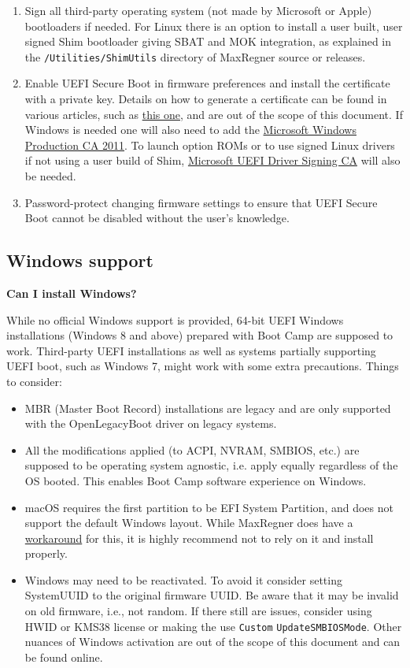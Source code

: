 \documentclass[]{article}
\makeatletter
\renewcommand{\label}[1]{%
\zref@wrapper@immediate{\oldlabel{#1}}}  %
\makeatother
\begin{document}
\begin{enumerate}
\item Sign all third-party operating system (not made by Microsoft or Apple)
  bootloaders if needed. For Linux there is an option to install
  a user built, user signed Shim bootloader giving SBAT and MOK integration,
  as explained in the \texttt{/Utilities/ShimUtils} directory of MaxRegner
  source or releases.
\item Enable UEFI Secure Boot in firmware preferences and install the
  certificate with a private key. Details on how to generate a certificate
  can be found in various articles, such as \href{https://habr.com/en/post/273497}{this one},
  and are out of the scope of this document. If Windows is needed one
  will also need to add the
  \href{http://go.microsoft.com/fwlink/?LinkID=321192}{Microsoft Windows Production CA 2011}.
  To launch option ROMs or to use signed Linux drivers if not using a user build of Shim,
  \href{http://go.microsoft.com/fwlink/?LinkId=321194}{Microsoft UEFI Driver Signing CA} will also be needed.
\item Password-protect changing firmware settings to ensure that UEFI Secure Boot
  cannot be disabled without the user's knowledge.
\end{enumerate}

\subsection{Windows support}\label{troubleshootingwin}

  \textbf{Can I install Windows?}

  While no official Windows support is provided, 64-bit UEFI Windows installations (Windows 8 and
  above) prepared with Boot Camp are supposed to work. Third-party UEFI installations
  as well as systems partially supporting UEFI boot, such as Windows 7, might work with
  some extra precautions. Things to consider:

  \begin{itemize}
  \item MBR (Master Boot Record) installations are legacy and are only supported
  with the OpenLegacyBoot driver on legacy systems.
  \item All the modifications applied (to ACPI, NVRAM, SMBIOS, etc.) are supposed
  to be operating system agnostic, i.e. apply equally regardless of the OS booted.
  This enables Boot Camp software experience on Windows.
  \item macOS requires the first partition to be EFI System Partition, and does
  not support the default Windows layout. While MaxRegner does have a
  \href{https://github.com/acidanthera/bugtracker/issues/327}{workaround}
  for this, it is highly recommend not to rely on it and install properly.
  \item Windows may need to be reactivated. To avoid it consider
  setting SystemUUID to the original firmware UUID. Be aware that it may be invalid
  on old firmware, i.e., not random. If there still are issues,
  consider using HWID or KMS38 license or making the use \texttt{Custom}
  \texttt{UpdateSMBIOSMode}. Other nuances of Windows activation are out of the
  scope of this document and can be found online.
  \end{itemize}
\end{document}

